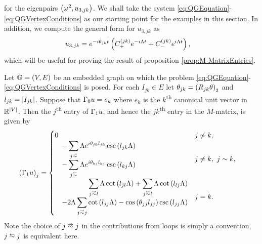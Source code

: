 for the eigenpairs $\left( \omega^2, u_{3,jk} \right)$.
We shall take the system \eqref{eq:QGEquation}-\eqref{eq:QGVertexConditions} as our starting point for the examples in this section.
In addition, we compute the general form for $u_{3,jk}$ as
\begin{align} \label{eq:CurlEdgeEqnGenSol}
	u_{3,jk} &= e^{-i\theta_{jk}t}\left(  C_{+}^{(jk)}e^{-i\Lambda t} + C_{-}^{(jk)}e^{i\Lambda t}  \right),
\end{align}
which will be useful for proving the result of proposition \ref{prop:M-MatrixEntries}. \newline

\begin{prop} \label{prop:M-MatrixEntries}
	Let $\mathbb{G}=\left( V,E \right)$ be an embedded graph on which the problem \eqref{eq:QGEquation}-\eqref{eq:QGVertexConditions} is posed.
	For each $I_{jk}\in E$ let $\theta_{jk} = \left( R_{jk}\theta \right)_2$ and $l_{jk} = \left\lvert I_{jk} \right\rvert$.
	Suppose that $\Gamma_0 u = e_k$ where $e_k$ is the $k$\textsuperscript{th} canonical unit vector in $\mathbb{R}^{\left\lvert V \right\rvert}$.
	Then the $j$\textsuperscript{th} entry of $\Gamma_1 u$, and hence the $jk$\textsuperscript{th} entry in the $M$-matrix, is given by
	\begin{align*}
		\bracs{\nmap u}_j &= 
		\begin{cases}
			\!\begin{aligned}
				0	
			\end{aligned}			
			& j \not\con k, \\
			\!\begin{aligned}
				-\sum_{j\conLeft} \effFreq e^{i\qm_{jk}l_{jk}} \csc\bracs{l_{jk}\effFreq} 
				\\ \quad - \sum_{j\conRight} \effFreq e^{i\qm_{kj}l_{kj}} \csc\bracs{l_{kj}\effFreq}
			\end{aligned}
			& j\neq k, \ j\con k, \\
			\!\begin{aligned}
				\sum_{j\conLeft l} \effFreq\cot\bracs{l_{jl}\effFreq}
				+ \sum_{j\conRight l} \effFreq\cot\bracs{l_{lj}\effFreq}
				\\ \quad - 2\effFreq\sum_{j\conLeft j} \cot\bracs{l_{jj}\effFreq} - \cos\bracs{\qm_{jj}l_{jj}}\csc\bracs{l_{jj}\effFreq}
			\end{aligned}
			& j=k.
		\end{cases}
	\end{align*}
	Note the choice of $j\conLeft j$ in the contributions from loops is simply a convention, $j\conRight j$ is equivalent here.
\end{prop}
